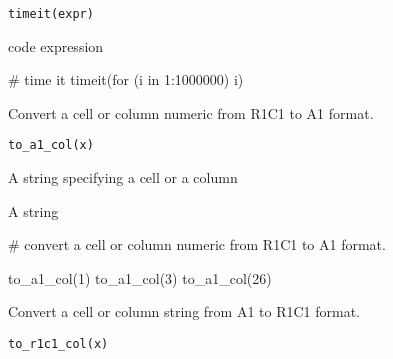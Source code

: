 \documentclass[letterpaper]{book}
\begin{document}
%
\begin{Usage}
\begin{verbatim}
timeit(expr)
\end{verbatim}
\end{Usage}
%
\begin{Arguments}
\begin{ldescription}
\item[\code{expr}] \R{} code expression
\end{ldescription}
\end{Arguments}
%
\begin{Examples}
\begin{ExampleCode}
# time it
timeit(for (i in 1:1000000) i)

\end{ExampleCode}
\end{Examples}
%
\begin{Description}
Convert a cell or column numeric from R1C1 to A1 format.
\end{Description}
%
\begin{Usage}
\begin{verbatim}
to_a1_col(x)
\end{verbatim}
\end{Usage}
%
\begin{Arguments}
\begin{ldescription}
\item[\code{x}] A string specifying a cell or a column
\end{ldescription}
\end{Arguments}
%
\begin{Value}
A string
\end{Value}
%
\begin{Examples}
\begin{ExampleCode}
# convert a cell or column numeric from R1C1 to A1 format.

to_a1_col(1)
to_a1_col(3)
to_a1_col(26)

\end{ExampleCode}
\end{Examples}
%
\begin{Description}
Convert a cell or column string from A1 to R1C1 format.
\end{Description}
%
\begin{Usage}
\begin{verbatim}
to_r1c1_col(x)
\end{verbatim}
\end{Usage}
\end{document}
